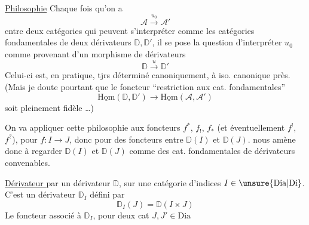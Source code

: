 \uline{Philosophie} Chaque fois qu'on a  
\[
\mathcal A\xrightarrow{u_0}\mathcal A'
\]
entre deux catégories qui peuvent s'interpréter  comme les catégories fondamentales de deux dérivateurs $\mathbb D,\mathbb D'$, il se pose la question d'interpréter $u_0$ comme provenant d'un morphisme de dérivateurs
\[
\mathbb D\xrightarrow{u}\mathbb D'
\]
Celui-ci est, en pratique, tjrs déterminé canoniquement, à iso. canonique près. (Mais je doute pourtant que le foncteur ``restriction aux cat. fondamentales''
\[
\underline{\mathrm{Hom}}(\mathbb D,\mathbb D')\longrightarrow\underline{\mathrm{Hom}}(\mathcal A,\mathcal A')
\]
soit pleinement fidèle \ldots)

On va appliquer cette philosophie aux foncteurs $f^*$, $f_!$, $f_*$ (et éventuellement $f^!$, $f^?$), pour $f:I\longrightarrow J$, donc pour des foncteurs entre $\mathbb D(I)$ et $\mathbb D(J)$.  nous amène donc à regarder $\mathbb D(I)$ et $\mathbb D(J)$ comme des cat. fondamentales de dérivateurs convenables.

\uline{Dérivateur } par un dérivateur $\mathbb D$, sur une catégorie d'indices $I\in\unsure{\mathrm{Dia}|\mathrm{Di}}$. C'est un dérivateur $\mathbb D_I$ défini par
\[
\mathbb D_I(J)=\mathbb D(I\times J)
\]
Le foncteur associé à $\mathbb D_I$, pour deux cat $J,J'\in\mathrm{Dia}$
